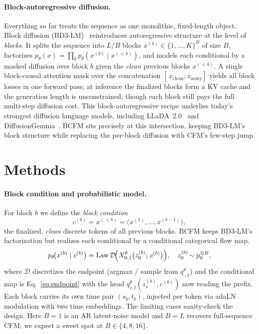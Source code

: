 \documentclass[twocolumn]{style}
\begin{document}
\paragraph{Block-autoregressive diffusion.} Everything so far treats the sequence as one monolithic, fixed-length object. Block diffusion (BD3-LM)~\citep{arriola2025block} reintroduces autoregressive structure at the level of \emph{blocks}. It splits the sequence into $L/B$ blocks $x^{(b)}\in\{1,\dots,K\}^B$ of size $B$, factorizes $p_\theta(x)=\prod_{b} p_\theta(x^{(b)}\mid x^{(<b)})$, and models each conditional by a masked diffusion over block $b$ given the \emph{clean} previous blocks $x^{(<b)}$. A single block-causal attention mask over the concatenation $[\,x_\text{clean};x_\text{noisy}]$ yields all block losses in one forward pass; at inference the finalized blocks form a KV cache and the generation length is unconstrained, though each block still pays the full multi-step diffusion cost. This block-autoregressive recipe underlies today's strongest diffusion language models, including LLaDA~2.0~\citep{bie2025llada2} and DiffusionGemma~\citep{deepmind2026diffgemma}. BCFM sits precisely at this intersection, keeping BD3-LM's block structure while replacing the per-block diffusion with CFM's few-step jump.


\section{Methods}
\label{sec:methods}
\paragraph{Block condition and probabilistic model.} For block $b$ we define the \emph{block condition}
\begin{equation}
c^{(b)} = x^{(<b)} = \bigl(x^{(1)},\dots,x^{(b-1)}\bigr),
\end{equation}
the finalized, \emph{clean} discrete tokens of all previous blocks. BCFM keeps BD3-LM's factorization but realizes each conditional by a conditional categorical flow map.
\begin{equation}
p_\theta\!\bigl(x^{(b)}\mid c^{(b)}\bigr)=\mathrm{Law}\,\mathcal{D}\!\Bigl(X^\theta_{0,1}\bigl(z_0^{(b)};\,c^{(b)}\bigr)\Bigr),\quad z_0^{(b)}\!\sim p_0^{\otimes B},
\end{equation}
where $\mathcal{D}$ discretizes the endpoint (argmax / sample from $q^\theta_{\cdot,1}$) and the conditional map is Eq.~\eqref{eq:endpoint} with the head $q^\theta_{s,t}(z_s^{(b)},c^{(b)})$ now reading the prefix. Each block carries its own time pair $(s_b,t_b)$, injected per token via adaLN modulation with two time embeddings. The limiting cases sanity-check the design. Here $B=1$ is an AR latent-noise model and $B=L$ recovers full-sequence CFM; we expect a sweet spot at $B\in\{4,8,16\}$.
\end{document}
